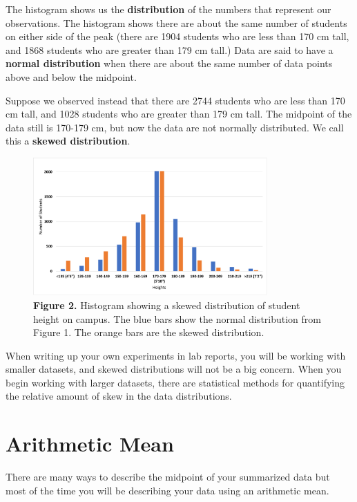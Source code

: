 \documentclass[
]{book}
\begin{document}
The histogram shows us the \textbf{distribution} of the numbers that represent our observations. The histogram shows there are about the same number of students on either side of the peak (there are 1904 students who are less than 170 cm tall, and 1868 students who are greater than 179 cm tall.) Data are said to have a \textbf{normal distribution} when there are about the same number of data points above and below the midpoint.

Suppose we observed instead that there are 2744 students who are less than 170 cm tall, and 1028 students who are greater than 179 cm tall. The midpoint of the data still is 170-179 cm, but now the data are not normally distributed. We call this a \textbf{skewed distribution}.

\begin{figure}
\centering
\includegraphics[width=0.8\textwidth,height=\textheight]{images/Histogram2.png}
\caption{\textbf{Figure 2.} Histogram showing a skewed distribution of student height on campus. The blue bars show the normal distribution from Figure 1. The orange bars are the skewed distribution.}
\end{figure}

When writing up your own experiments in lab reports, you will be working with smaller datasets, and skewed distributions will not be a big concern. When you begin working with larger datasets, there are statistical methods for quantifying the relative amount of skew in the data distributions.

\hypertarget{arithmetic-mean}{%
\section{Arithmetic Mean}\label{arithmetic-mean}}

There are many ways to describe the midpoint of your summarized data but most of the time you will be describing your data using an arithmetic mean.
\end{document}
